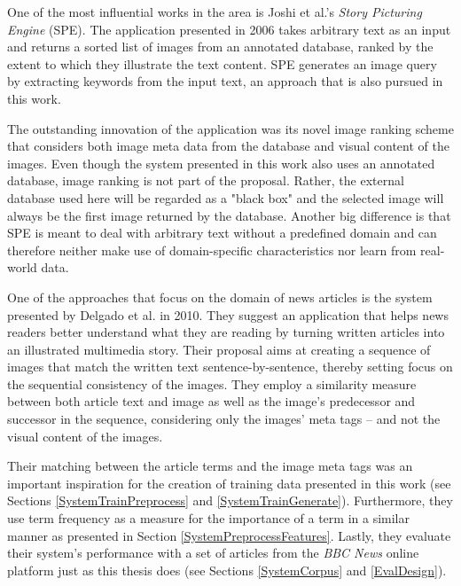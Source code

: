 \documentclass[11pt,a4paper,twoside]{article}
\begin{document}
\bigskip

One of the most influential works in the area is Joshi et al.'s \emph{Story Picturing Engine} (SPE). \cite{Joshi2006TheIllustration} The application presented in 2006 takes arbitrary text as an input and returns a sorted list of images from an annotated database, ranked by the extent to which they illustrate the text content. SPE generates an image query by extracting keywords from the input text, an approach that is also pursued in this work. 

The outstanding innovation of the application was its novel image ranking scheme that considers both image meta data from the database and visual content of the images. Even though the system presented in this work also uses an annotated database, image ranking is not part of the proposal. Rather, the external database used here will be regarded as a "black box" and the selected image will always be the first image returned by the database. Another big difference is that SPE is meant to deal with arbitrary text without a predefined domain and can therefore neither make use of domain-specific characteristics nor learn from real-world data.

\bigskip

One of the approaches that focus on the domain of news articles is the system presented by Delgado et al. in 2010. \cite{Delgado2010AutomatedExperience} They suggest an application that helps news readers better understand what they are reading by turning written articles into an illustrated multimedia story. Their proposal aims at creating a sequence of images that match the written text sentence-by-sentence, thereby setting focus on the sequential consistency of the images. They employ a similarity measure between both article text and image as well as the image's predecessor and successor in the sequence, considering only the images' meta tags -- and not the visual content of the images.

Their matching between the article terms and the image meta tags was an important inspiration for the creation of training data presented in this work (see Sections \ref{SystemTrainPreprocess} and \ref{SystemTrainGenerate}). Furthermore, they use term frequency as a measure for the importance of a term in a similar manner as presented in Section \ref{SystemPreprocessFeatures}. Lastly, they evaluate their system's performance with a set of articles from the \emph{BBC News} online platform just as this thesis does (see Sections \ref{SystemCorpus} and \ref{EvalDesign}).
\end{document}
